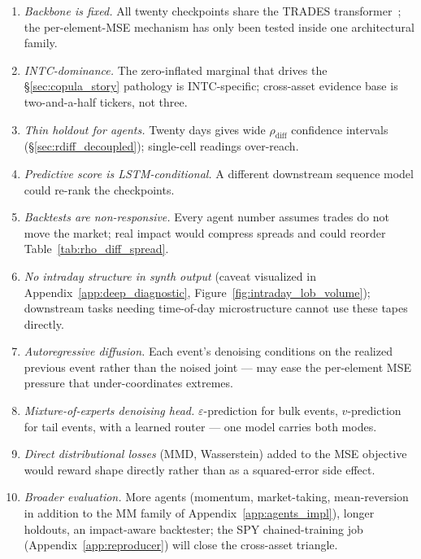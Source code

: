 \documentclass[journal]{IEEEtran}
\newcommand{\eps}{\varepsilon}
\newcommand{\rdiff}{\rho_{\text{diff}}}
\theoremstyle{definition}   %
\begin{document}
\begin{enumerate}
    \item \emph{Backbone is fixed.} All twenty checkpoints share the
    TRADES transformer~\cite{berti2025trades}; the per-element-MSE
    mechanism has only been tested inside one architectural family.
    \item \emph{INTC-dominance.} The zero-inflated marginal that
    drives the \S\ref{sec:copula_story} pathology is INTC-specific;
    cross-asset evidence base is two-and-a-half tickers, not three.
    \item \emph{Thin holdout for agents.} Twenty days gives wide
    $\rdiff$ confidence intervals (\S\ref{sec:rdiff_decoupled});
    single-cell readings over-reach.
    \item \emph{Predictive score is LSTM-conditional.} A different
    downstream sequence model could re-rank the checkpoints.
    \item \emph{Backtests are non-responsive.} Every agent number
    assumes trades do not move the market; real impact would
    compress spreads and could reorder Table~\ref{tab:rho_diff_spread}.
    \item \emph{No intraday structure in synth output} (caveat
    visualized in Appendix~\ref{app:deep_diagnostic},
    Figure~\ref{fig:intraday_lob_volume}); downstream tasks needing
    time-of-day microstructure cannot use these tapes directly.
    \item \emph{Autoregressive diffusion.} Each event's denoising
    conditions on the realized previous event rather than the noised
    joint --- may ease the per-element MSE pressure that
    under-coordinates extremes.
    \item \emph{Mixture-of-experts denoising head.}
    $\eps$-prediction for bulk events, $v$-prediction for tail
    events, with a learned router --- one model carries both modes.
    \item \emph{Direct distributional losses} (MMD, Wasserstein)
    added to the MSE objective would reward shape directly rather
    than as a squared-error side effect.
    \item \emph{Broader evaluation.} More agents (momentum,
    market-taking, mean-reversion in addition to the MM family of
    Appendix~\ref{app:agents_impl}), longer holdouts, an
    impact-aware backtester; the SPY chained-training job
    (Appendix~\ref{app:reproducer}) will close the cross-asset
    triangle.
\end{enumerate}
\end{document}
